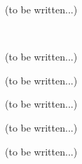 (to be written...)


\begin{figure}[p]%
\begin{Figbox}[valign=top]%
%
\vfill~
\end{Figbox}%
\end{figure}%







(to be written...)



(to be written...)







(to be written...)






(to be written...)



(to be written...)

\begin{appendices}
\end{appendices}

